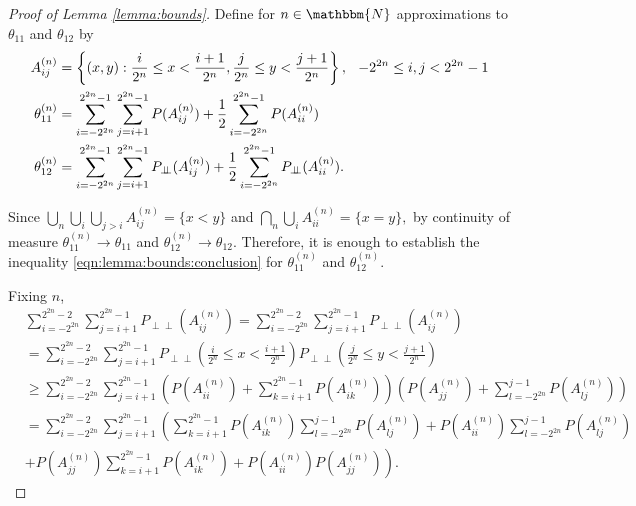 \documentclass[12pt]{article}
\DeclareMathOperator{\AUC}{AUC}
\renewcommand{\P}{P}
\newcommand{\cind}{\perp \!\!\! \perp}
\newcommand{\aucindiv}{\theta_{11}}%
\newcommand{\aucpop}{\theta_{12}}%
\newcommand{\Pind}{P_{\cind}}
\newcommand{\A}[1]{P(A^{(n)}_{#1})}
\begin{document}
\begin{proof}[Proof of Lemma \ref{lemma:bounds}]
  Define for $n\in\mathbbm{N}$ approximations to $\aucindiv$ and $\aucpop$ by
  \begin{align}
    A_{ij}^{(n)} &= \left\{(x,y) : \frac{i}{2^n}\le x<\frac{i+1}{2^n},
    \frac{j}{2^n}\le y<\frac{j+1}{2^n}\right\},
    \hspace{.1in}-2^{2n}\le i,j < 2^{2n}-1\\
    \aucindiv^{(n)} &= \sum_{i=-2^{2n}}^{2^{2n}-1}\sum_{j=i+1}^{2^{2n}-1} \P(A_{ij}^{(n)})
                      + \frac{1}{2}\sum_{i=-2^{2n}}^{2^{2n}-1} \P(A_{ii}^{(n)})\\
    \aucpop^{(n)} &= \sum_{i=-2^{2n}}^{2^{2n}-1}\sum_{j=i+1}^{2^{2n}-1} \Pind(A_{ij}^{(n)})
                    + \frac{1}{2}\sum_{i=-2^{2n}}^{2^{2n}-1} \Pind(A_{ii}^{(n)}).
  \end{align}

  Since $\bigcup_n \bigcup_i\bigcup_{j>i} A_{ij}^{(n)} = \{x < y\}$ and
    $\bigcap_n\bigcup_i A_{ii}^{(n)} = \{x=y\},$
    by continuity of measure $\aucindiv^{(n)}\to\aucindiv$ and $\aucpop^{(n)}\to\aucpop$. Therefore, it is enough to establish the inequality \eqref{eqn:lemma:bounds:conclusion} for $\aucindiv^{(n)}$ and $\aucpop^{(n)}$.

    Fixing $n$,
    \begin{align}
      &\sum_{i=-2^{2n}}^{2^{2n}-2}\sum_{j=i+1}^{2^{2n}-1} \Pind(A_{ij}^{(n)})
      = \sum_{i=-2^{2n}}^{2^{2n}-2}\sum_{j=i+1}^{2^{2n}-1} \Pind(A_{ij}^{(n)})\\
      &= \sum_{i=-2^{2n}}^{2^{2n}-2}\sum_{j=i+1}^{2^{2n}-1} \Pind(\frac{i}{2^n}\le x<\frac{i+1}{2^n})
        \Pind(\frac{j}{2^n}\le y<\frac{j+1}{2^n})\\
      &\ge \sum_{i=-2^{2n}}^{2^{2n}-2}\sum_{j=i+1}^{2^{2n}-1}
        (\A{ii}+\sum_{k=i+1}^{2^{2n}-1}\A{ik})
        (\A{jj}+\sum_{l=-2^{2n}}^{j-1}\A{lj})\\
      &= \sum_{i=-2^{2n}}^{2^{2n}-2}\sum_{j=i+1}^{2^{2n}-1}\left(
        \sum_{k=i+1}^{2^{2n}-1}\A{ik}\sum_{l=-2^{2n}}^{j-1}\A{lj} +
        \A{ii}\sum_{l=-2^{2n}}^{j-1}\A{lj} \right.\\
        & \left. +
      \A{jj}\sum_{k=i+1}^{2^{2n}-1}\A{ik} +
        \A{ii}\A{jj}
    \right).
    \end{align}


\end{proof}
\end{document}
